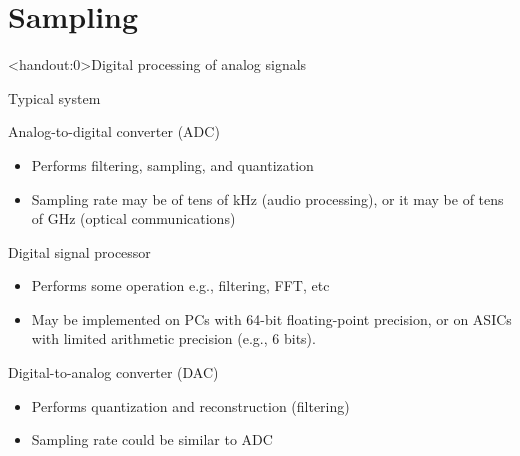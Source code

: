 \documentclass[10pt]{beamer}
\begin{document}
\section{Sampling}
\begin{frame}<handout:0>{Digital processing of analog signals}
\begin{block}{Typical system}
	\vspace{-0.7cm}
	\begin{center}
		\resizebox{\linewidth}{!}{}
	\end{center}
\end{block}
\vspace{-0.5cm}
\begin{block}{Analog-to-digital converter (ADC)}
	\begin{itemize}
		\item Performs filtering, sampling, and quantization
		\item Sampling rate may be of tens of kHz (audio processing), or it may be of tens of GHz (optical communications)
	\end{itemize}
\end{block}
\vspace{-0.3cm}
\begin{block}{Digital signal processor}
	\begin{itemize} \itemsep 0pt
		\item Performs some operation e.g., filtering, FFT, etc
		\item May be implemented on PCs with 64-bit floating-point precision, or on ASICs with limited arithmetic precision (e.g., 6 bits).
	\end{itemize}
\end{block}
\vspace{-0.3cm}
\begin{block}{Digital-to-analog converter (DAC)}
	\begin{itemize}
		\item Performs quantization and reconstruction (filtering)
		\item Sampling rate could be similar to ADC
	\end{itemize}
\end{block}
\end{frame}
\end{document}
